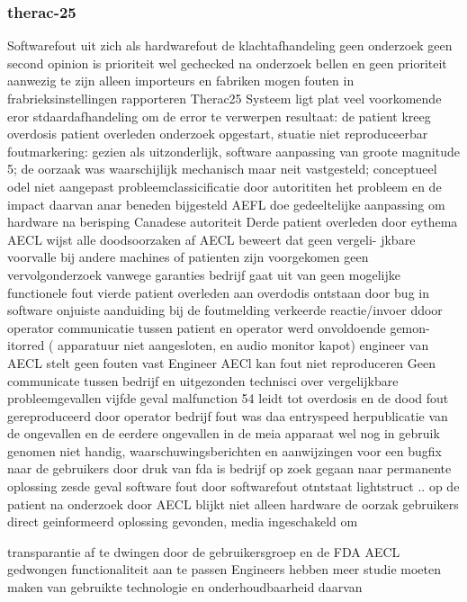 \subsubsection{therac-25}
Softwarefout uit zich als hardwarefout de klachtafhandeling geen onderzoek geen second opinion is prioriteit wel 
gechecked na onderzoek bellen en geen prioriteit aanwezig te zijn alleen importeurs en fabriken mogen fouten 
in frabrieksinstellingen rapporteren 
Therac25 Systeem ligt plat veel voorkomende eror stdaardafhandeling om de error te verwerpen resultaat: 
de patient kreeg overdosis patient overleden onderzoek opgestart, stuatie niet reproduceerbar foutmarkering: 
gezien als uitzonderlijk, software aanpassing van groote magnitude 5; de oorzaak was waarschijlijk mechanisch 
maar neit vastgesteld; conceptueel odel niet aangepast probleemclassicificatie door autorititen het probleem 
en de impact daarvan anar beneden bijgesteld AEFL doe gedeeltelijke aanpassing om hardware na berisping 
Canadese autoriteit 
Derde patient overleden door eythema AECL wijst alle doodsoorzaken af AECL beweert dat geen vergeli- 
jkbare voorvalle bij andere machines of patienten zijn voorgekomen geen vervolgonderzoek vanwege garanties 
bedrijf gaat uit van geen mogelijke functionele fout 
vierde patient overleden aan overdodis ontstaan door bug in software onjuiste aanduiding bij de foutmelding 
verkeerde reactie/invoer ddoor operator communicatie tussen patient en operator werd onvoldoende gemon- 
itorred ( apparatuur niet aangesloten, en audio monitor kapot) engineer van AECL stelt geen fouten vast 
Engineer AECl kan fout niet reproduceren Geen communicate tussen bedrijf en uitgezonden technisci over 
vergelijkbare probleemgevallen 
vijfde geval malfunction 54 leidt tot overdosis en de dood fout gereproduceerd door operator bedrijf fout 
was daa entryspeed herpublicatie van de ongevallen en de eerdere ongevallen in de meia apparaat wel nog in 
gebruik genomen niet handig, waarschuwingsberichten en aanwijzingen voor een bugfix naar de gebruikers door 
druk van fda is bedrijf op zoek gegaan naar permanente oplossing 
zesde geval software fout door softwarefout otntstaat lightstruct .. op de patient na onderzoek door AECL 
blijkt niet alleen hardware de oorzak gebruikers direct geinformeerd oplossing gevonden, media ingeschakeld om 

transparantie af te dwingen door de gebruikersgroep en de FDA AECL gedwongen functionaliteit aan te passen 
Engineers hebben meer studie moeten maken van gebruikte technologie en onderhoudbaarheid daarvan 



